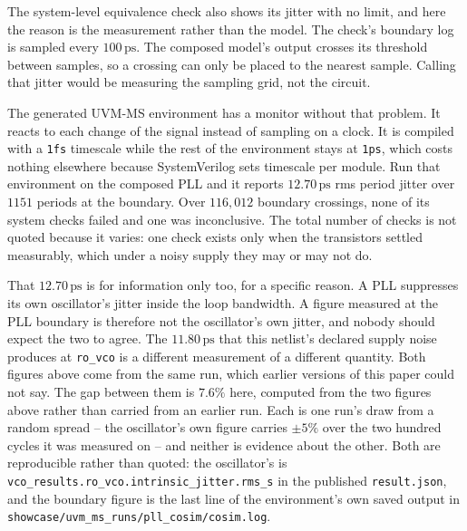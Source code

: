 \documentclass[11pt,a4paper]{article}
\newcommand{\unit}[1]{\,\textrm{#1}}
\begin{document}
\begin{itemize}[leftmargin=1.5em,itemsep=0.3em]
        The system-level equivalence check also shows its jitter with
        no limit, and here the reason is the measurement rather than
        the model. The check's boundary log is sampled every
        $100\unit{ps}$. The composed model's output crosses its
        threshold between samples, so a crossing can only be placed to
        the nearest sample. Calling that jitter would be measuring the
        sampling grid, not the circuit.

        The generated UVM-MS environment has a monitor without that
        problem. It reacts to each change of the signal instead of
        sampling on a clock. It is compiled with a \texttt{1fs}
        timescale while the rest of the environment stays at
        \texttt{1ps}, which costs nothing elsewhere because
        SystemVerilog sets timescale per module. Run that environment
        on the composed PLL and it reports $12.70\unit{ps}$ rms period
        jitter over $1151$ periods at the boundary. Over $116{,}012$
        boundary crossings, none of its system checks failed and one
        was inconclusive. The total number of checks is not quoted
        because it varies: one check exists only when the transistors
        settled measurably, which under a noisy supply they may or may
        not do.

        That $12.70\unit{ps}$ is for information only too, for a
        specific reason. A PLL suppresses its own oscillator's jitter
        inside the loop bandwidth. A figure measured at the PLL
        boundary is therefore not the oscillator's own jitter, and
        nobody should expect the two to agree. The $11.80\unit{ps}$
        that this netlist's declared supply noise produces at
        \texttt{ro\_vco} is a different measurement of a different
        quantity. Both figures above come from the same run, which
        earlier versions of this paper could not say. The gap between
        them is $7.6\%$ here, computed from the two figures above
        rather than carried from an earlier run. Each is one run's draw
        from a random spread -- the oscillator's own figure carries
        $\pm5\%$ over the two hundred cycles it was measured on -- and
        neither is evidence about the other. Both are reproducible
        rather than quoted: the oscillator's is
        \texttt{vco\_results.ro\_vco.intrinsic\_jitter.rms\_s} in the
        published \texttt{result.json}, and the boundary figure is the
        last line of the environment's own saved output in
        \texttt{showcase/uvm\_ms\_runs/pll\_cosim/cosim.log}.


\end{itemize}
\end{document}
